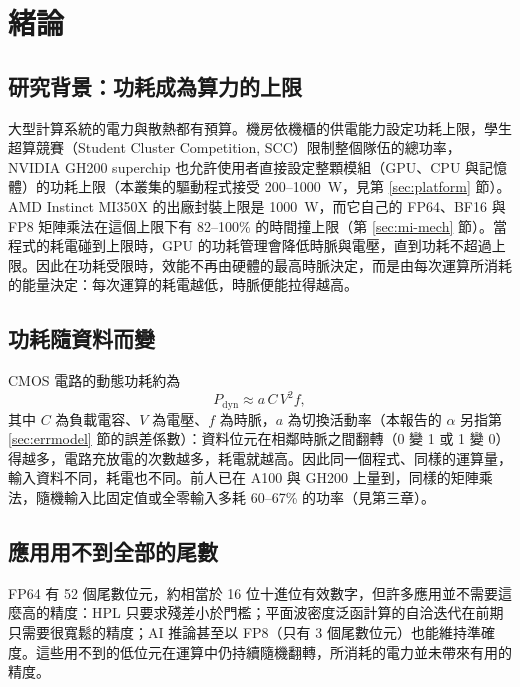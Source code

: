 \chapter{緒論}\label{ch:intro}

\section{研究背景：功耗成為算力的上限}\label{sec:motivation-cap}

大型計算系統的電力與散熱都有預算。機房依機櫃的供電能力設定功耗上限，學生超算競賽（Student Cluster Competition, SCC）限制整個隊伍的總功率，NVIDIA GH200 superchip 也允許使用者直接設定整顆模組（GPU、CPU 與記憶體）的功耗上限（本叢集的驅動程式接受 200–1000~W，見第 \ref{sec:platform} 節）。AMD Instinct MI350X 的出廠封裝上限是 1000~W，而它自己的 FP64、BF16 與 FP8 矩陣乘法在這個上限下有 82–100\% 的時間撞上限（第 \ref{sec:mi-mech} 節）。當程式的耗電碰到上限時，GPU 的功耗管理會降低時脈與電壓，直到功耗不超過上限。因此在功耗受限時，效能不再由硬體的最高時脈決定，而是由每次運算所消耗的能量決定：每次運算的耗電越低，時脈便能拉得越高。

\section{功耗隨資料而變}\label{sec:motivation-data}

CMOS 電路的動態功耗約為
\begin{equation}
  P_{\mathrm{dyn}} \approx a\, C\, V^{2} f ,
  \label{eq:cmos}
\end{equation}
其中 $C$ 為負載電容、$V$ 為電壓、$f$ 為時脈，$a$ 為切換活動率（本報告的 $\alpha$ 另指第 \ref{sec:errmodel} 節的誤差係數）：資料位元在相鄰時脈之間翻轉（0 變 1 或 1 變 0）得越多，電路充放電的次數越多，耗電就越高。因此同一個程式、同樣的運算量，輸入資料不同，耗電也不同。前人已在 A100 與 GH200 上量到，同樣的矩陣乘法，隨機輸入比固定值或全零輸入多耗 60–67\% 的功率（見第三章）。

\section{應用用不到全部的尾數}\label{sec:motivation-bits}

FP64 有 52 個尾數位元，約相當於 16 位十進位有效數字，但許多應用並不需要這麼高的精度：HPL 只要求殘差小於門檻；平面波密度泛函計算的自洽迭代在前期只需要很寬鬆的精度；AI 推論甚至以 FP8（只有 3 個尾數位元）也能維持準確度。這些用不到的低位元在運算中仍持續隨機翻轉，所消耗的電力並未帶來有用的精度。

